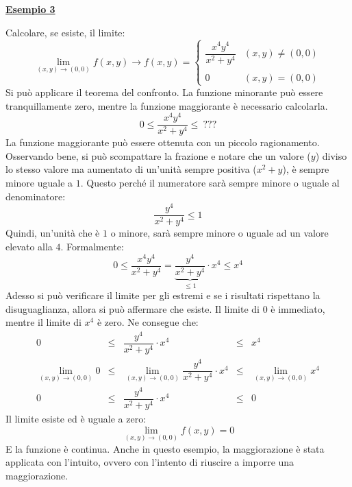 \documentclass[a4paper]{article}
\newcommand{\example}[1]{\textcolor{Green4}{\textbf{#1}}}
\begin{document}
	\begin{flushleft}\label{limiti: esempio 3}
		\example{\underline{Esempio 3}}
	\end{flushleft}
	Calcolare, se esiste, il limite:
	\begin{equation*}
		\displaystyle\lim_{\left(x,y\right) \rightarrow \left(0,0\right)} f\left(x,y\right) \rightarrow f\left(x,y\right) = 
		\begin{cases}
			\dfrac{x^{4}y^{4}}{x^{2} + y^{4}}	& \left(x,y\right) \ne \left(0,0\right) \\ \\
			0										& \left(x,y\right) = \left(0,0\right)
		\end{cases}
	\end{equation*}
	Si può applicare il teorema del confronto. La funzione minorante può essere tranquillamente zero, mentre la funzione maggiorante è necessario calcolarla.
	\begin{equation*}
		0 \le \dfrac{x^{4}y^{4}}{x^{2} + y^{4}} \le \: ???
	\end{equation*}
	La funzione maggiorante può essere ottenuta con un piccolo ragionamento. Osservando bene, si può scompattare la frazione e notare che un valore ($y$) diviso lo stesso valore ma aumentato di un'unità sempre positiva ($x^{2}+y$), è sempre minore uguale a $1$. Questo perché il numeratore sarà sempre minore o uguale al denominatore:
	\begin{equation*}
		\dfrac{y^{4}}{x^{2}+y^{4}} \le 1
	\end{equation*}
	Quindi, un'unità che è $1$ o minore, sarà sempre minore o uguale ad un valore elevato alla $4$. Formalmente:
	\begin{equation*}
			0 \le \dfrac{x^{4}y^{4}}{x^{2}+y^{4}} = \underbrace{\dfrac{y^{4}}{x^{2}+y^{4}}}_{\le 1} \cdot x^{4} \le x^{4}
	\end{equation*}
	Adesso si può verificare il limite per gli estremi e se i risultati rispettano la disuguaglianza, allora si può affermare che esiste. Il limite di $0$ è immediato, mentre il limite di $x^{4}$ è zero. Ne consegue che:
	\begin{equation*}
		\begin{array}{rcccl}
			0 &\le& \dfrac{y^{4}}{x^{2}+y^{4}} \cdot x^{4} &\le& x^{4} \\ [1em]
			\displaystyle\lim_{\left(x,y\right)\rightarrow\left(0,0\right)} 0 &\le& \displaystyle\lim_{\left(x,y\right)\rightarrow\left(0,0\right)}\dfrac{y^{4}}{x^{2}+y^{4}} \cdot x^{4} &\le& \displaystyle\lim_{\left(x,y\right)\rightarrow\left(0,0\right)} x^{4} \\ [1em]
			0 &\le& \dfrac{y^{4}}{x^{2}+y^{4}} \cdot x^{4} &\le& 0
		\end{array}
	\end{equation*}
	Il limite esiste ed è uguale a zero:
	\begin{equation*}
		\displaystyle\lim_{\left(x,y\right) \rightarrow \left(0,0\right)} f\left(x,y\right) = 0
	\end{equation*}
	E la funzione è continua. Anche in questo esempio, la maggiorazione è stata applicata con l'intuito, ovvero con l'intento di riuscire a imporre una maggiorazione.\newpage
\end{document}
